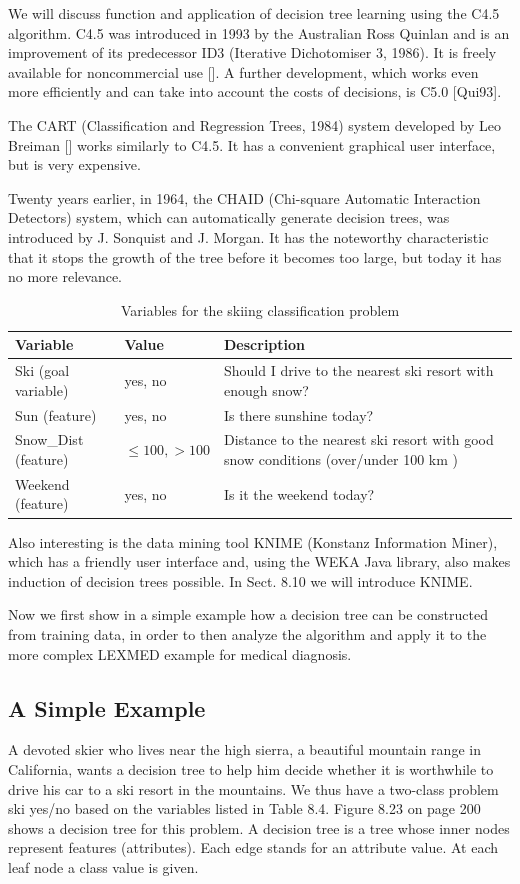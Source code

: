 \documentclass[10pt]{book}
\begin{document}
We will discuss function and application of decision tree learning using the C4.5 algorithm. C4.5 was introduced in 1993 by the Australian Ross Quinlan and is an improvement of its predecessor ID3 (Iterative Dichotomiser 3, 1986). It is freely available for noncommercial use [\cite{quinlan1993c45}]. A further development, which works even more efficiently and can take into account the costs of decisions, is C5.0 [Qui93].

The CART (Classification and Regression Trees, 1984) system developed by Leo Breiman [\cite{breiman1984cart}] works similarly to C4.5. It has a convenient graphical user interface, but is very expensive.

Twenty years earlier, in 1964, the CHAID (Chi-square Automatic Interaction Detectors) system, which can automatically generate decision trees, was introduced by J. Sonquist and J. Morgan. It has the noteworthy characteristic that it stops the growth of the tree before it becomes too large, but today it has no more relevance.

\begin{table}[htbp]
\centering
\caption{Variables for the skiing classification problem}
\begin{tabular}{|l|l|l|}
\hline
Variable & Value & Description \\
\hline
Ski (goal variable) & yes, no & Should I drive to the nearest ski resort with enough snow? \\
\hline
Sun (feature) & yes, no & Is there sunshine today? \\
\hline
Snow\_Dist (feature) & $\leq 100,>100$ & Distance to the nearest ski resort with good snow conditions (over/under 100 km ) \\
\hline
Weekend (feature) & yes, no & Is it the weekend today? \\
\hline
\end{tabular}
\end{table}

Also interesting is the data mining tool KNIME (Konstanz Information Miner), which has a friendly user interface and, using the WEKA Java library, also makes induction of decision trees possible. In Sect. 8.10 we will introduce KNIME.

Now we first show in a simple example how a decision tree can be constructed from training data, in order to then analyze the algorithm and apply it to the more complex LEXMED example for medical diagnosis.

\subsection{A Simple Example}
A devoted skier who lives near the high sierra, a beautiful mountain range in California, wants a decision tree to help him decide whether it is worthwhile to drive his car to a ski resort in the mountains. We thus have a two-class problem ski yes/no based on the variables listed in Table 8.4. Figure 8.23 on page 200 shows a decision tree for this problem. A decision tree is a tree whose inner nodes represent features (attributes). Each edge stands for an attribute value. At each leaf node a class value is given.
\end{document}
